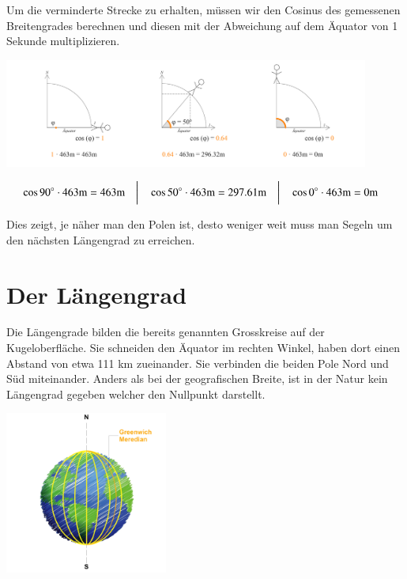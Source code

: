 \begin{refsection}
Um die verminderte Strecke zu erhalten, müssen wir den Cosinus des gemessenen Breitengrades berechnen und diesen mit der Abweichung auf dem Äquator von 1 Sekunde multiplizieren.

\begin{center}
        \includegraphics[width=0.9\textwidth]{kugel/Korrekturbeiwert.jpg}
\end{center}

\[
\begin{aligned}
&\cos 90^\circ \cdot 463\text{m} = 463\text{m}
&
&\text{\bigg \vert}
&
&\cos 50^\circ \cdot 463\text{m} = 297.61\text{m}
&
&\text{\bigg \vert}
&
&\cos 0^\circ \cdot 463\text{m} = 0\text{m}
\end{aligned}
\]

Dies zeigt, je näher man den Polen ist, desto weniger weit muss man Segeln um den nächsten Längengrad zu erreichen.



\section{Der Längengrad}
Die Längengrade bilden die bereits genannten Grosskreise auf der Kugeloberfläche.
Sie schneiden den Äquator im rechten Winkel, haben dort einen Abstand von etwa 111 km zueinander. Sie verbinden die beiden Pole Nord und Süd miteinander. Anders als bei der geografischen Breite, ist in der Natur kein Längengrad gegeben welcher den Nullpunkt darstellt.

\begin{center}
        \includegraphics[width=0.4\textwidth]{kugel/Laengengrad.jpg}
\end{center}



\end{refsection}
